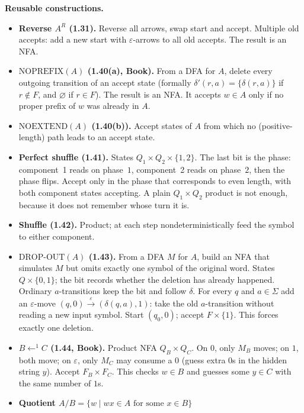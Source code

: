 \documentclass[11pt,a4paper]{article}
\newcommand{\eps}{\varepsilon}
\begin{document}
\textbf{Reusable constructions.}
\begin{itemize}
  \item \textbf{Reverse $A^R$ (1.31).} Reverse all arrows, swap start
        and accept. Multiple old accepts: add a new start with
        $\eps$-arrows to all old accepts. The result is an NFA.
  \item \textbf{$\mathrm{NOPREFIX}(A)$ (1.40(a), Book).} From a DFA
        for $A$, delete every outgoing transition of an accept state
        (formally $\delta'(r,a)=\{\delta(r,a)\}$ if $r\notin F$, and
        $\varnothing$ if $r\in F$). The result is an NFA. It accepts
        $w\in A$ only if no proper prefix of $w$ was already in $A$.
  \item \textbf{$\mathrm{NOEXTEND}(A)$ (1.40(b)).} Accept states of
        $A$ from which no (positive-length) path leads to an accept
        state.
  \item \textbf{Perfect shuffle (1.41).} States
        $Q_1\times Q_2\times\{1,2\}$. The last bit is the phase:
        component~1 reads on phase~$1$, component~2 reads on
        phase~$2$, then the phase flips. Accept only in the phase
        that corresponds to even length, with both component states
        accepting. A plain $Q_1\times Q_2$ product is not enough,
        because it does not remember whose turn it is.
  \item \textbf{Shuffle (1.42).} Product; at each step
        nondeterministically feed the symbol to either component.
  \item \textbf{$\mathrm{DROP\text{-}OUT}(A)$ (1.43).} From a DFA
        $M$ for $A$, build an NFA that simulates $M$ but omits exactly
        one symbol of the original word. States $Q\times\{0,1\}$; the
        bit records whether the deletion has already happened.
        Ordinary $a$-transitions keep the bit and follow $\delta$.
        For every $q$ and $a\in\Sigma$ add an $\eps$-move
        $(q,0)\xrightarrow{\eps}(\delta(q,a),1)$: take the old
        $a$-transition without reading a new input symbol. Start
        $(q_0,0)$; accept $F\times\{1\}$. This forces exactly one
        deletion.
  \item \textbf{$B\mathbin{\leftarrow^1}C$ (1.44, Book).} Product
        NFA $Q_B\times Q_C$. On $0$, only $M_B$ moves; on $1$, both
        move; on $\eps$, only $M_C$ may consume a $0$ (guess extra
        $0$s in the hidden string $y$). Accept $F_B\times F_C$. This
        checks $w\in B$ and guesses some $y\in C$ with the same
        number of $1$s.
  \item \textbf{Quotient $A/B=\{w\mid wx\in A\text{ for some }x\in B\}$
}
\end{itemize}
\end{document}
